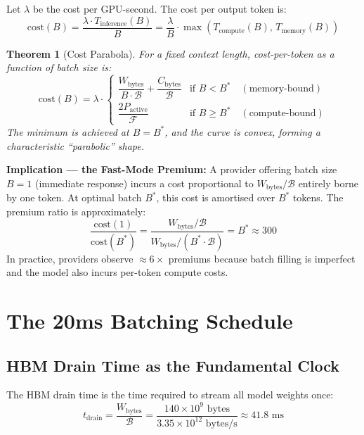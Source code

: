 \documentclass[11pt,a4paper]{article}
\newtheorem{theorem}{Theorem}
\newcommand{\Tcomp}{T_{\mathrm{compute}}}
\newcommand{\Tmem}{T_{\mathrm{memory}}}
\newcommand{\BW}{\mathcal{B}}
\newcommand{\FLOPS}{\mathcal{F}}
\begin{document}
Let $\lambda$ be the cost per GPU-second. The cost per output token is:
\[
  \text{cost}(B) = \frac{\lambda \cdot T_\text{inference}(B)}{B}
                = \frac{\lambda}{B} \cdot \max\!\left(\Tcomp(B),\, \Tmem(B)\right)
\]

\begin{theorem}[Cost Parabola]
\label{thm:parabola}
For a fixed context length, cost-per-token as a function of batch size is:
\[
  \text{cost}(B) = \lambda \cdot
  \begin{cases}
    \dfrac{W_\text{bytes}}{B \cdot \BW} + \dfrac{C_\text{bytes}}{\BW}
      & \text{if } B < B^* \quad (\text{memory-bound}) \\[10pt]
    \dfrac{2 P_\text{active}}{\FLOPS}
      & \text{if } B \geq B^* \quad (\text{compute-bound})
  \end{cases}
\]
The minimum is achieved at $B = B^*$, and the curve is convex, forming a
characteristic ``parabolic'' shape.
\end{theorem}

\textbf{Implication — the Fast-Mode Premium:}
A provider offering batch size $B=1$ (immediate response) incurs a cost
proportional to $W_\text{bytes}/\BW$ entirely borne by one token.
At optimal batch $B^*$, this cost is amortised over $B^*$ tokens.
The premium ratio is approximately:
\[
  \frac{\text{cost}(1)}{\text{cost}(B^*)}
  = \frac{W_\text{bytes}/\BW}
         {W_\text{bytes}/(B^* \cdot \BW)}
  = B^* \approx 300
\]
In practice, providers observe $\approx 6\times$ premiums because batch
filling is imperfect and the model also incurs per-token compute costs.

\section{The 20ms Batching Schedule}
\label{sec:batch}

\subsection{HBM Drain Time as the Fundamental Clock}

The HBM drain time is the time required to stream all model weights once:
\[
  t_\text{drain} = \frac{W_\text{bytes}}{\BW}
                 = \frac{140 \times 10^9 \text{ bytes}}{3.35 \times 10^{12} \text{ bytes/s}}
                 \approx 41.8 \text{ ms}
\]
\end{document}
